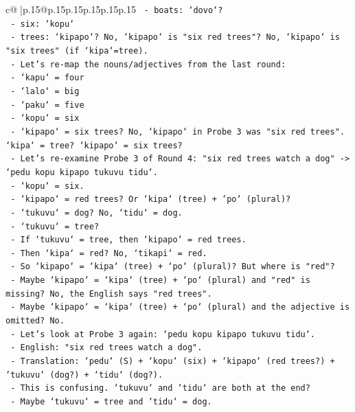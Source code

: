 \documentclass{article}
\begin{document}
{\begin{supertabular}{c@{$\;$}|p{.15\linewidth}@{}p{.15\linewidth}p{.15\linewidth}p{.15\linewidth}p{.15\linewidth}p{.15\linewidth}}
{{{\texttt{    {-} boats: `dovo`?} \\
\texttt{    {-} six: `kopu`} \\
\texttt{    {-} trees: `kipapo`? No, `kipapo` is "six red trees"? No, `kipapo` is "six trees" (if `kipa`=tree).} \\
\texttt{    {-} Let's re{-}map the nouns/adjectives from the last round:} \\
\texttt{      {-} `kapu` = four} \\
\texttt{      {-} `lalo` = big} \\
\texttt{      {-} `paku` = five} \\
\texttt{      {-} `kopu` = six} \\
\texttt{      {-} `kipapo` = six trees? No, `kipapo` in Probe 3 was "six red trees". `kipa` = tree? `kipapo` = six trees?} \\
\texttt{      {-} Let's re{-}examine Probe 3 of Round 4: "six red trees watch a dog" {-}> `pedu kopu kipapo tukuvu tidu`.} \\
\texttt{        {-} `kopu` = six.} \\
\texttt{        {-} `kipapo` = red trees? Or `kipa` (tree) + `po` (plural)?} \\
\texttt{        {-} `tukuvu` = dog? No, `tidu` = dog.} \\
\texttt{        {-} `tukuvu` = tree?} \\
\texttt{        {-} If `tukuvu` = tree, then `kipapo` = red trees.} \\
\texttt{        {-} Then `kipa` = red? No, `tikapi` = red.} \\
\texttt{        {-} So `kipapo` = `kipa` (tree) + `po` (plural)? But where is "red"?} \\
\texttt{        {-} Maybe `kipapo` = `kipa` (tree) + `po` (plural) and "red" is missing? No, the English says "red trees".} \\
\texttt{        {-} Maybe `kipapo` = `kipa` (tree) + `po` (plural) and the adjective is omitted? No.} \\
\texttt{        {-} Let's look at Probe 3 again: `pedu kopu kipapo tukuvu tidu`.} \\
\texttt{        {-} English: "six red trees watch a dog".} \\
\texttt{        {-} Translation: `pedu` (S) + `kopu` (six) + `kipapo` (red trees?) + `tukuvu` (dog?) + `tidu` (dog?).} \\
\texttt{        {-} This is confusing. `tukuvu` and `tidu` are both at the end?} \\
\texttt{        {-} Maybe `tukuvu` = tree and `tidu` = dog.} \\
}}}
\end{supertabular}}
\end{document}
